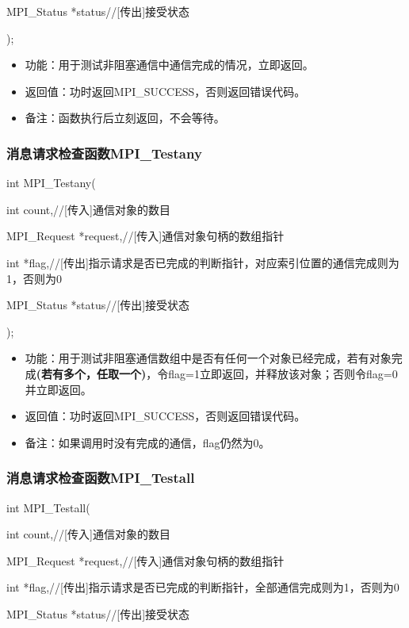 \documentclass[UTF8]{article}%
\begin{document}
    \qquad MPI\_Status   *status//[传出]接受状态

);

\begin{itemize}
    \item 功能：用于测试非阻塞通信中通信完成的情况，立即返回。
    \item 返回值：功时返回MPI\_SUCCESS，否则返回错误代码。
    \item 备注：函数执行后立刻返回，不会等待。
\end{itemize}

\subsubsection{消息请求检查函数MPI\_Testany}

int MPI\_Testany(

    \qquad int           count,//[传入]通信对象的数目

    \qquad MPI\_Request  *request,//[传入]通信对象句柄的数组指针

    \qquad int           *flag,//[传出]指示请求是否已完成的判断指针，对应索引位置的通信完成则为1，否则为0

    \qquad MPI\_Status   *status//[传出]接受状态
    
);

\begin{itemize}
    \item 功能：用于测试非阻塞通信数组中是否有任何一个对象已经完成，若有对象完成\textbf{(若有多个，任取一个)}，令flag=1立即返回，并释放该对象；否则令flag=0并立即返回。
    \item 返回值：功时返回MPI\_SUCCESS，否则返回错误代码。
    \item 备注：如果调用时没有完成的通信，flag仍然为0。
\end{itemize}

\subsubsection{消息请求检查函数MPI\_Testall}

int MPI\_Testall(

    \qquad int           count,//[传入]通信对象的数目

    \qquad MPI\_Request  *request,//[传入]通信对象句柄的数组指针

    \qquad int           *flag,//[传出]指示请求是否已完成的判断指针，全部通信完成则为1，否则为0

    \qquad MPI\_Status   *status//[传出]接受状态
    
\end{document}

